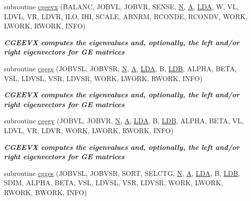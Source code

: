 \begin{DoxyCompactItemize}
subroutine \hyperlink{group__complexGEeigen_ga397ffbf0007d6b72f4639379df27ae53}{cgeevx} (B\+A\+L\+A\+N\+C, J\+O\+B\+V\+L, J\+O\+B\+V\+R, S\+E\+N\+S\+E, \hyperlink{polmisc_8c_a0240ac851181b84ac374872dc5434ee4}{N}, \hyperlink{classA}{A}, \hyperlink{example__user_8c_ae946da542ce0db94dced19b2ecefd1aa}{L\+D\+A}, W, V\+L, L\+D\+V\+L, V\+R, L\+D\+V\+R, I\+L\+O, I\+H\+I, S\+C\+A\+L\+E, A\+B\+N\+R\+M, R\+C\+O\+N\+D\+E, R\+C\+O\+N\+D\+V, W\+O\+R\+K, L\+W\+O\+R\+K, R\+W\+O\+R\+K, I\+N\+F\+O)
\begin{DoxyCompactList}\small\item\em {\bfseries  C\+G\+E\+E\+V\+X computes the eigenvalues and, optionally, the left and/or right eigenvectors for G\+E matrices} \end{DoxyCompactList}\item 
subroutine \hyperlink{group__complexGEeigen_ga3b808d00232e0291ef72b774c371638b}{cgegs} (J\+O\+B\+V\+S\+L, J\+O\+B\+V\+S\+R, \hyperlink{polmisc_8c_a0240ac851181b84ac374872dc5434ee4}{N}, \hyperlink{classA}{A}, \hyperlink{example__user_8c_ae946da542ce0db94dced19b2ecefd1aa}{L\+D\+A}, B, \hyperlink{example__user_8c_a50e90a7104df172b5a89a06c47fcca04}{L\+D\+B}, A\+L\+P\+H\+A, B\+E\+T\+A, V\+S\+L, L\+D\+V\+S\+L, V\+S\+R, L\+D\+V\+S\+R, W\+O\+R\+K, L\+W\+O\+R\+K, R\+W\+O\+R\+K, I\+N\+F\+O)
\begin{DoxyCompactList}\small\item\em {\bfseries  C\+G\+E\+E\+V\+X computes the eigenvalues and, optionally, the left and/or right eigenvectors for G\+E matrices} \end{DoxyCompactList}\item 
subroutine \hyperlink{group__complexGEeigen_ga193cdd210dd5b0451503fddee82947e1}{cgegv} (J\+O\+B\+V\+L, J\+O\+B\+V\+R, \hyperlink{polmisc_8c_a0240ac851181b84ac374872dc5434ee4}{N}, \hyperlink{classA}{A}, \hyperlink{example__user_8c_ae946da542ce0db94dced19b2ecefd1aa}{L\+D\+A}, B, \hyperlink{example__user_8c_a50e90a7104df172b5a89a06c47fcca04}{L\+D\+B}, A\+L\+P\+H\+A, B\+E\+T\+A, V\+L, L\+D\+V\+L, V\+R, L\+D\+V\+R, W\+O\+R\+K, L\+W\+O\+R\+K, R\+W\+O\+R\+K, I\+N\+F\+O)
\begin{DoxyCompactList}\small\item\em {\bfseries  C\+G\+E\+E\+V\+X computes the eigenvalues and, optionally, the left and/or right eigenvectors for G\+E matrices} \end{DoxyCompactList}\item 
subroutine \hyperlink{group__complexGEeigen_gaead5d7a4df1e51d7f25d9540acc596e8}{cgges} (J\+O\+B\+V\+S\+L, J\+O\+B\+V\+S\+R, S\+O\+R\+T, S\+E\+L\+C\+T\+G, \hyperlink{polmisc_8c_a0240ac851181b84ac374872dc5434ee4}{N}, \hyperlink{classA}{A}, \hyperlink{example__user_8c_ae946da542ce0db94dced19b2ecefd1aa}{L\+D\+A}, B, \hyperlink{example__user_8c_a50e90a7104df172b5a89a06c47fcca04}{L\+D\+B}, S\+D\+I\+M, A\+L\+P\+H\+A, B\+E\+T\+A, V\+S\+L, L\+D\+V\+S\+L, V\+S\+R, L\+D\+V\+S\+R, W\+O\+R\+K, L\+W\+O\+R\+K, R\+W\+O\+R\+K, B\+W\+O\+R\+K, I\+N\+F\+O)

\end{DoxyCompactItemize}
